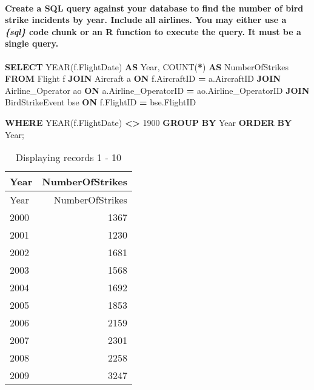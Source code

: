 \documentclass[
]{article}
\newenvironment{Shaded}{\begin{snugshade}}{\end{snugshade}}
\newcommand{\DataTypeTok}[1]{\textcolor[rgb]{0.13,0.29,0.53}{#1}}
\newcommand{\DecValTok}[1]{\textcolor[rgb]{0.00,0.00,0.81}{#1}}
\newcommand{\FunctionTok}[1]{\textcolor[rgb]{0.00,0.00,0.00}{#1}}
\newcommand{\KeywordTok}[1]{\textcolor[rgb]{0.13,0.29,0.53}{\textbf{#1}}}
\newcommand{\NormalTok}[1]{#1}
\newcommand{\OperatorTok}[1]{\textcolor[rgb]{0.81,0.36,0.00}{\textbf{#1}}}
\begin{document}
\hypertarget{create-a-sql-query-against-your-database-to-find-the-number-of-bird-strike-incidents-by-year.-include-all-airlines.-you-may-either-use-a-sql-code-chunk-or-an-r-function-to-execute-the-query.-it-must-be-a-single-query.}{%
\paragraph{\texorpdfstring{Create a SQL query against your database to
find the number of bird strike incidents by year. Include all airlines.
You may either use a \emph{\{sql\}} code chunk or an R function to
execute the query. It must be a single
query.}{Create a SQL query against your database to find the number of bird strike incidents by year. Include all airlines. You may either use a \{sql\} code chunk or an R function to execute the query. It must be a single query.}}\label{create-a-sql-query-against-your-database-to-find-the-number-of-bird-strike-incidents-by-year.-include-all-airlines.-you-may-either-use-a-sql-code-chunk-or-an-r-function-to-execute-the-query.-it-must-be-a-single-query.}}

\begin{Shaded}
\begin{Highlighting}[]
\KeywordTok{SELECT} 
    \DataTypeTok{YEAR}\NormalTok{(f.FlightDate) }\KeywordTok{AS} \DataTypeTok{Year}\NormalTok{,}
    \FunctionTok{COUNT}\NormalTok{(}\OperatorTok{*}\NormalTok{) }\KeywordTok{AS}\NormalTok{ NumberOfStrikes}
\KeywordTok{FROM} 
\NormalTok{    Flight f}
\KeywordTok{JOIN} 
\NormalTok{    Aircraft a }\KeywordTok{ON}\NormalTok{ f.AircraftID }\OperatorTok{=}\NormalTok{ a.AircraftID}
\KeywordTok{JOIN} 
\NormalTok{    Airline\_Operator ao }\KeywordTok{ON}\NormalTok{ a.Airline\_OperatorID }\OperatorTok{=}\NormalTok{ ao.Airline\_OperatorID}
\KeywordTok{JOIN} 
\NormalTok{    BirdStrikeEvent bse }\KeywordTok{ON}\NormalTok{ f.FlightID }\OperatorTok{=}\NormalTok{ bse.FlightID}

\KeywordTok{WHERE} 
    \DataTypeTok{YEAR}\NormalTok{(f.FlightDate) }\OperatorTok{\textless{}\textgreater{}} \DecValTok{1900}
\KeywordTok{GROUP} \KeywordTok{BY} 
    \DataTypeTok{Year}
\KeywordTok{ORDER} \KeywordTok{BY} 
    \DataTypeTok{Year}\NormalTok{;}
\end{Highlighting}
\end{Shaded}

\begin{longtable}[]{@{}lr@{}}
\caption{Displaying records 1 - 10}\tabularnewline
\toprule()
Year & NumberOfStrikes \\
\midrule()
\endfirsthead
\toprule()
Year & NumberOfStrikes \\
\midrule()
\endhead
2000 & 1367 \\
2001 & 1230 \\
2002 & 1681 \\
2003 & 1568 \\
2004 & 1692 \\
2005 & 1853 \\
2006 & 2159 \\
2007 & 2301 \\
2008 & 2258 \\
2009 & 3247 \\
\bottomrule()
\end{longtable}
\end{document}
